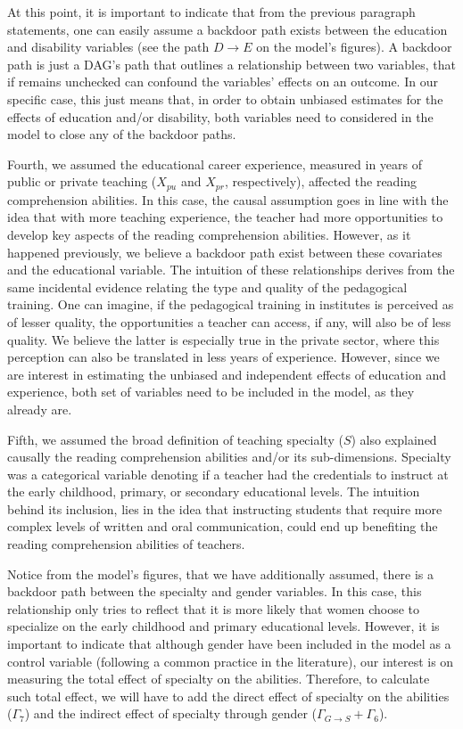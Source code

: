 At this point, it is important to indicate that from the previous paragraph statements, one can easily assume a backdoor path exists between the education and disability variables (see the path $D \rightarrow E$ on the model's figures). A backdoor path is just a DAG's path that outlines a relationship between two variables, that if remains unchecked can confound the variables' effects on an outcome. In our specific case, this just means that, in order to obtain unbiased estimates for the effects of education and/or disability, both variables need to considered in the model to close any of the backdoor paths.

Fourth, we assumed the educational career experience, measured in years of public or private teaching ($X_{pu}$ and $X_{pr}$, respectively), affected the reading comprehension abilities. In this case, the causal assumption goes in line with the idea that with more teaching experience, the teacher had more opportunities to develop key aspects of the reading comprehension abilities. However, as it happened previously, we believe a backdoor path exist between these covariates and the educational variable. The intuition of these relationships derives from the same incidental evidence relating the type and quality of the pedagogical training. One can imagine, if the pedagogical training in institutes is perceived as of lesser quality, the opportunities a teacher can access, if any, will also be of less quality. We believe the latter is especially true in the private sector, where this perception can also be translated in less years of experience. However, since we are interest in estimating the unbiased and independent effects of education and experience, both set of variables need to be included in the model, as they already are.

Fifth, we assumed the broad definition of teaching specialty ($S$) also explained causally the reading comprehension abilities and/or its sub-dimensions. Specialty was a categorical variable denoting if a teacher had the credentials to instruct at the early childhood, primary, or secondary educational levels. The intuition behind its inclusion, lies in the idea that instructing students that require more complex levels of written and oral communication, could end up benefiting the reading comprehension abilities of teachers. 

Notice from the model's figures, that we have additionally assumed, there is a backdoor path between the specialty and gender variables. In this case, this relationship only tries to reflect that it is more likely that women choose to specialize on the early childhood and primary educational levels. However, it is important to indicate that although gender have been included in the model as a control variable (following a common practice in the literature), our interest is on measuring the total effect of specialty on the abilities. Therefore, to calculate such total effect, we will have to add the direct effect of specialty on the abilities ($\Gamma_{7}$) and the indirect effect of specialty through gender ($\Gamma_{G \rightarrow S} + \Gamma_{6}$).

